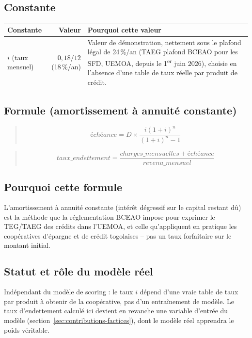 \documentclass[11pt,a4paper]{article}
\newenvironment{formule}{\begin{quote}}{\end{quote}}
\begin{document}
\subsection*{Constante}

\begin{tabular}{@{}L{3.2cm}rL{6.5cm}@{}}
\toprule
Constante & Valeur & Pourquoi cette valeur \\
\midrule
$i$ (taux mensuel) & $0{,}18/12$ (18\,\%/an) & Valeur de démonstration, nettement sous le plafond
  légal de 24\,\%/an (TAEG plafond BCEAO pour les SFD, UEMOA, depuis le 1\textsuperscript{er} juin
  2026), choisie en l'absence d'une table de taux réelle par produit de crédit. \\
\bottomrule
\end{tabular}

\subsection*{Formule (amortissement à annuité constante)}
\begin{formule}
\[
\mathit{échéance} = D \times \frac{i (1+i)^n}{(1+i)^n - 1}
\]
\end{formule}
\begin{formule}
\[
\mathit{taux\_endettement} = \frac{\mathit{charges\_mensuelles} + \mathit{échéance}}{\mathit{revenu\_mensuel}}
\]
\end{formule}

\subsection*{Pourquoi cette formule}
L'amortissement à annuité constante (intérêt dégressif sur le capital restant dû) est la méthode
que la réglementation BCEAO impose pour exprimer le TEG/TAEG des crédits dans l'UEMOA, et celle
qu'appliquent en pratique les coopératives d'épargne et de crédit togolaises -- pas un taux
forfaitaire sur le montant initial.

\subsection*{Statut et rôle du modèle réel}
Indépendant du modèle de scoring : le taux $i$ dépend d'une vraie table de taux par produit à
obtenir de la coopérative, pas d'un entraînement de modèle. Le taux d'endettement calculé ici
devient en revanche une variable d'entrée du modèle (section~\ref{sec:contributions-factices}),
dont le modèle réel apprendra le poids véritable.
\end{document}
